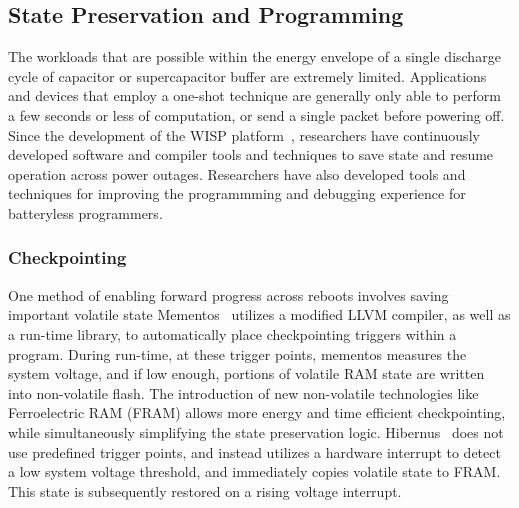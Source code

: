\subsection{State Preservation and Programming}
The workloads that are possible within the energy envelope of a single discharge cycle of capacitor or supercapacitor buffer are extremely limited.
Applications and devices that employ a one-shot technique are generally only able to perform a few seconds or less of computation, or send a single packet before powering off.
Since the development of the WISP platform~\cite{sample2008design}, researchers have continuously developed software and compiler tools and techniques to save state and resume operation across power outages.
Researchers have also developed tools and techniques for improving the programmming and debugging experience for batteryless programmers.

\subsubsection{Checkpointing}
One method of enabling forward progress across reboots involves saving important volatile state
Mementos~\cite{ransford2012mementos} utilizes a modified LLVM compiler, as well as a run-time library, to automatically place checkpointing triggers within a program. During run-time, at these trigger points, mementos measures the system voltage, and if low enough, portions of volatile RAM state are written into non-volatile flash.
The introduction of new non-volatile technologies like Ferroelectric RAM (FRAM) allows more energy and time efficient checkpointing, while simultaneously simplifying the state preservation logic.
Hibernus~\cite{balsamo2014hibernus} does not use predefined trigger points, and instead utilizes a hardware interrupt to detect a low system voltage threshold, and immediately copies volatile state to FRAM. This state is subsequently restored on a rising voltage interrupt.


